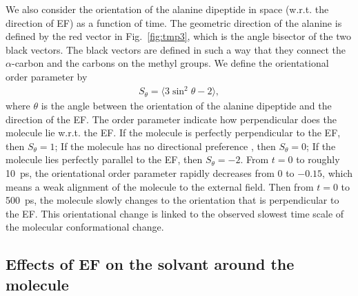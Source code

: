 \documentclass[a4paper,preprint,unsortedaddress,onecolumn]{revtex4-1}
\begin{document}
We also consider the orientation of the alanine dipeptide in space (w.r.t. the direction of EF) as a function
of time.
The geometric direction of the alanine is defined by the red vector in
Fig.~\ref{fig:tmp3}, which is the angle bisector of the two black vectors.
The black vectors are defined in such a way that they connect the $\alpha$-carbon and the carbons
on the methyl groups. We define the orientational order parameter by
\begin{align}
  S_\theta = \langle 3\sin^2\theta - 2\rangle,
\end{align}
where $\theta$ is the angle between the orientation of the alanine dipeptide
and the direction of the EF. The order parameter
indicate how perpendicular does the molecule lie w.r.t. the EF.
If the molecule is perfectly perpendicular to the EF, then $S_\theta = 1$;
If the molecule has no directional
preference , then $S_\theta = 0$;
If the molecule lies perfectly parallel to the EF, then $S_\theta = -2$.
From $t=0$ to roughly 10~ps, the orientational order parameter rapidly
decreases from 0 to $-0.15$, which means a weak alignment of the molecule to the external field.
Then from $t=0$ to 500~ps, the molecule slowly changes to the orientation
that is perpendicular to the EF.
This orientational change is linked to the observed slowest
time scale of the molecular conformational change.


\subsection{Effects of EF on the solvant around the molecule}
\end{document}
